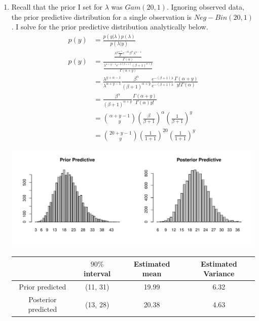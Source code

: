 \documentclass[12pt]{article}\usepackage[]{graphicx}\usepackage[]{color}
\newenvironment{knitrout}{}{} %
\begin{document}
\begin{doublespacing}
\begin{enumerate}
\item Recall that the prior I set for $\lambda$ was $Gam(20, 1)$. Ignoring observed data, the prior predictive distribution for a single observation is $Neg-Bin(20, 1)$. I solve for the prior predictive distribution analytically below.
\begin{align*}
p(y) &= \frac{p(y|\lambda) p(\lambda)}{p(\lambda|y)} \\
p(y) &= \frac{\frac{\lambda^y \frac{e^{-\lambda}}{y!}e^{-\beta\lambda}\beta^{\alpha}\lambda^{\alpha-1}}{\Gamma(\alpha)}}{\frac{\lambda^{\alpha+y-1}e^{-\lambda(\beta+1)}(\beta+1)^{\alpha+y}}{\Gamma(\alpha+y)}} \\
&= \frac{\lambda^{y+\alpha-1}}{\lambda^{\alpha+y-1}} \frac{\beta^{\alpha}}{(\beta+1)^{\alpha+y}} \frac{e^{-(\beta+1)\lambda}}{e^{-(\beta+1)\lambda}} \frac{\Gamma(\alpha+y)}{y!\Gamma(\alpha)} \\
&= \frac{\beta^{\alpha}}{(\beta+1)^{\alpha+y}}\frac{\Gamma(\alpha+y)}{\Gamma(\alpha)y!} \\
&= {\alpha+y-1 \choose y}(\frac{\beta}{\beta+1})^{\alpha} (\frac{1}{\beta+1})^y \\
&= {20+y-1 \choose y}(\frac{1}{1+1})^{20} (\frac{1}{1+1})^y
\end{align*}

\begin{knitrout}\footnotesize
{}\color{fgcolor}
\includegraphics[width=\linewidth]{figure/priorpred-1} 

\end{knitrout}



\begin{table}[H]
\centering
\begin{tabular}{c|c|c|c}
 & $90\%$ interval & Estimated mean & Estimated Variance \\
\hline
Prior predicted & (11, 31) & 19.99 & 6.32 \\
Posterior predicted & (13, 28) & 20.38 & 4.63 \\
\hline
\end{tabular}
\end{table}



\end{enumerate}
\end{doublespacing}
\end{document}
